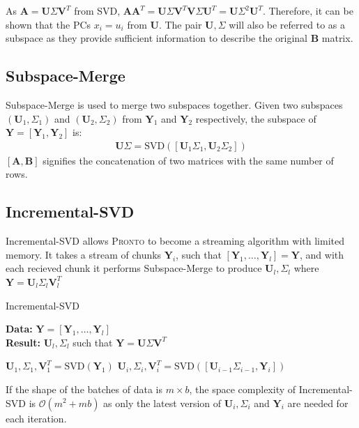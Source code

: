 As $\mathbf{A} = \mathbf{U}\Sigma\mathbf{V}^T$ from SVD,
$\mathbf{AA}^T = \mathbf{U}\Sigma\mathbf{V}^T\mathbf{V}\Sigma\mathbf{U}^T =
\mathbf{U}\Sigma^2\mathbf{U}^T$. Therefore, it can be shown that the PCs
$x_i = u_i$ from $\mathbf{U}$. The pair $\mathbf{U}, \Sigma$ will also be
referred to as a subspace as they provide sufficient information to describe the
original $\mathbf{B}$ matrix.

\subsection{Subspace-Merge}
Subspace-Merge is used to merge two subspaces together. Given two subspaces
$(\mathbf{U}_1, \Sigma_1)$ and $(\mathbf{U}_2, \Sigma_2)$ from $\mathbf{Y}_1$ and
$\mathbf{Y}_2$ respectively, the subspace of $\mathbf{Y} = [\mathbf{Y}_1,
\mathbf{Y}_2]$ is:
\begin{align}
    \mathbf{U}\Sigma = \text{SVD}([\mathbf{U}_1\Sigma_1, \mathbf{U}_2\Sigma_2])
\end{align}
$[\mathbf{A}, \mathbf{B}]$ signifies the concatenation of two matrices with the
same number of rows.

\subsection{Incremental-SVD}
Incremental-SVD allows \textsc{Pronto} to become a streaming algorithm with limited
memory. It takes a stream of chunks $\mathbf{Y}_i$, such that  $[\mathbf{Y}_1,
\ldots, \mathbf{Y}_l] = \mathbf{Y}$, and with each recieved chunk it performs
Subspace-Merge to produce $\mathbf{U}_l, \Sigma_l$ where $\mathbf{Y} =
\mathbf{U}_l\Sigma_l\mathbf{V}_l^T$

\begin{algorithm}
\caption{Incremental-SVD}
\textbf{Data:} $\mathbf{Y} = [\mathbf{Y}_1, \dots, \mathbf{Y}_l]$ \\
    \textbf{Result:} $\mathbf{U}_l, \Sigma_l$ such that $\mathbf{Y} =
    \mathbf{U}\Sigma\mathbf{V}^T$
\begin{algorithmic}
\State $\mathbf{U}_1, \Sigma_1, \mathbf{V}_1^T = \text{SVD}(\mathbf{Y}_1)$
\State $\mathbf{U}_i, \Sigma_i, \mathbf{V}_i^T = \text{SVD}([\mathbf{U}_{i-1}\Sigma_{i-1}, \mathbf{Y}_i])$
\EndFor
\end{algorithmic}
\end{algorithm}
If the shape of the batches of data is $m \times b$, the space complexity of
Incremental-SVD is $\mathcal{O}(m^2 + mb)$ as only the latest version of
$\mathbf{U}_i,\Sigma_i$ and $\mathbf{Y}_i$ are needed for each iteration.


